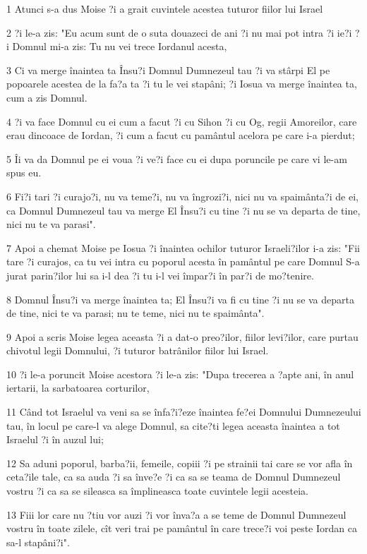 \par 1 Atunci s-a dus Moise ?i a grait cuvintele acestea tuturor fiilor lui Israel
\par 2 ?i le-a zis: "Eu acum sunt de o suta douazeci de ani ?i nu mai pot intra ?i ie?i ?i Domnul mi-a zis: Tu nu vei trece Iordanul acesta,
\par 3 Ci va merge înaintea ta Însu?i Domnul Dumnezeul tau ?i va stârpi El pe popoarele acestea de la fa?a ta ?i tu le vei stapâni; ?i Iosua va merge înaintea ta, cum a zis Domnul.
\par 4 ?i va face Domnul cu ei cum a facut ?i cu Sihon ?i cu Og, regii Amoreilor, care erau dincoace de Iordan, ?i cum a facut cu pamântul acelora pe care i-a pierdut;
\par 5 Îi va da Domnul pe ei voua ?i ve?i face cu ei dupa poruncile pe care vi le-am spus eu.
\par 6 Fi?i tari ?i curajo?i, nu va teme?i, nu va îngrozi?i, nici nu va spaimânta?i de ei, ca Domnul Dumnezeul tau va merge El Însu?i cu tine ?i nu se va departa de tine, nici nu te va parasi".
\par 7 Apoi a chemat Moise pe Iosua ?i înaintea ochilor tuturor Israeli?ilor i-a zis: "Fii tare ?i curajos, ca tu vei intra cu poporul acesta în pamântul pe care Domnul S-a jurat parin?ilor lui sa i-l dea ?i tu i-l vei împar?i în par?i de mo?tenire.
\par 8 Domnul Însu?i va merge înaintea ta; El Însu?i va fi cu tine ?i nu se va departa de tine, nici te va parasi; nu te teme, nici nu te spaimânta".
\par 9 Apoi a scris Moise legea aceasta ?i a dat-o preo?ilor, fiilor levi?ilor, care purtau chivotul legii Domnului, ?i tuturor batrânilor fiilor lui Israel.
\par 10 ?i le-a poruncit Moise acestora ?i le-a zis: "Dupa trecerea a ?apte ani, în anul iertarii, la sarbatoarea corturilor,
\par 11 Când tot Israelul va veni sa se înfa?i?eze înaintea fe?ei Domnului Dumnezeului tau, în locul pe care-l va alege Domnul, sa cite?ti legea aceasta înaintea a tot Israelul ?i în auzul lui;
\par 12 Sa aduni poporul, barba?ii, femeile, copiii ?i pe strainii tai care se vor afla în ceta?ile tale, ca sa auda ?i sa înve?e ?i ca sa se teama de Domnul Dumnezeul vostru ?i ca sa se sileasca sa împlineasca toate cuvintele legii acesteia.
\par 13 Fiii lor care nu ?tiu vor auzi ?i vor înva?a a se teme de Domnul Dumnezeul vostru în toate zilele, cît veri trai pe pamântul în care trece?i voi peste Iordan ca sa-l stapâni?i".
